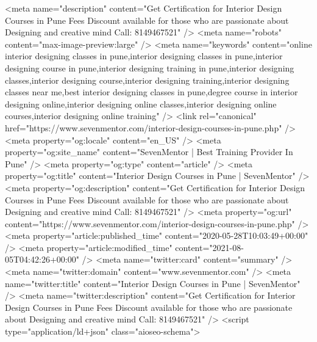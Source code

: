 <meta name="description" content="Get Certification for Interior Design Courses in Pune Fees Discount available for those who are passionate about Designing and creative mind Call: 8149467521" />
<meta name="robots" content="max-image-preview:large" />
<meta name="keywords" content="online interior designing classes in pune,interior designing classes in pune,interior designing course in pune,interior designing training in pune,interior designing classes,interior designing course,interior designing training,interior designing classes near me,best interior designing classes in pune,degree course in interior designing online,interior designing online classes,interior designing online courses,interior designing online training" />
<link rel="canonical" href="https://www.sevenmentor.com/interior-design-courses-in-pune.php" />
<meta property="og:locale" content="en_US" />
<meta property="og:site_name" content="SevenMentor | Best Training Provider In Pune" />
<meta property="og:type" content="article" />
<meta property="og:title" content="Interior Design Courses in Pune | SevenMentor" />
<meta property="og:description" content="Get Certification for Interior Design Courses in Pune Fees Discount available for those who are passionate about Designing and creative mind Call: 8149467521" />
<meta property="og:url" content="https://www.sevenmentor.com/interior-design-courses-in-pune.php" />
<meta property="article:published_time" content="2020-05-28T10:03:49+00:00" />
<meta property="article:modified_time" content="2021-08-05T04:42:26+00:00" />
<meta name="twitter:card" content="summary" />
<meta name="twitter:domain" content="www.sevenmentor.com" />
<meta name="twitter:title" content="Interior Design Courses in Pune | SevenMentor" />
<meta name="twitter:description" content="Get Certification for Interior Design Courses in Pune Fees Discount available for those who are passionate about Designing and creative mind Call: 8149467521" />
<script type="application/ld+json" class="aioseo-schema">
